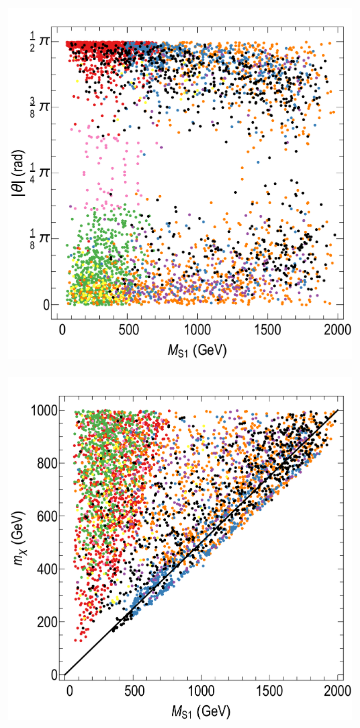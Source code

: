 \begin{figure}[t]
\begin{subfigure}[t]{0.43\textwidth}
\includegraphics[width=\textwidth]{texinputs/05_relic/figures/relic_scalar/MS1_Theta2.pdf}
\label{fig:scan1b}
\end{subfigure}
\vspace{0.5ex}
\begin{subfigure}[t]{0.43\textwidth}
\includegraphics[width=\textwidth]{texinputs/05_relic/figures/relic_scalar/MS1_mDM3.pdf}

\end{subfigure}
\end{figure}

